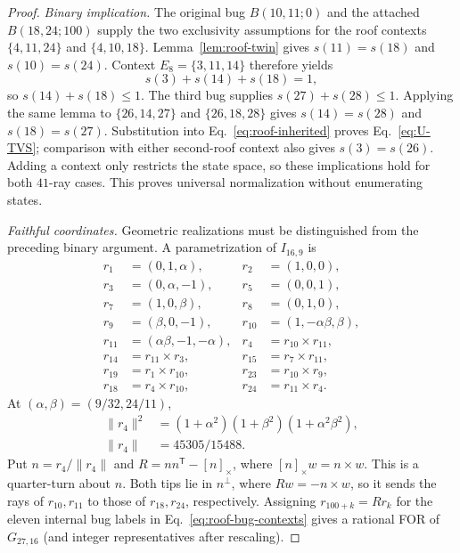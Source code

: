\documentclass[aps,pra,reprint,superscriptaddress,longbibliography,nofootinbib,floatfix,10pt]{revtex4-2}
\theoremstyle{definition}\newtheorem{definition}[theorem]{Definition}
\theoremstyle{remark}\newtheorem{remark}[theorem]{Remark}
\begin{document}
\begin{proof}
\emph{Binary implication.} The original bug $B(10,11;0)$ and the attached $B(18,24;100)$ supply the two exclusivity assumptions for the roof contexts $\{4,11,24\}$ and $\{4,10,18\}$. Lemma~\ref{lem:roof-twin} gives $s(11)=s(18)$ and $s(10)=s(24)$. Context $E_8=\{3,11,14\}$ therefore yields
\begin{equation}\label{eq:roof-inherited}
s(3)+s(14)+s(18)=1,
\end{equation}
so $s(14)+s(18)\le1$. The third bug supplies $s(27)+s(28)\le1$. Applying the same lemma to $\{26,14,27\}$ and $\{26,18,28\}$ gives $s(14)=s(28)$ and $s(18)=s(27)$. Substitution into Eq.~\eqref{eq:roof-inherited} proves Eq.~\eqref{eq:U-TVS}; comparison with either second-roof context also gives $s(3)=s(26)$. Adding a context only restricts the state space, so these implications hold for both $41$-ray cases. This proves universal normalization without enumerating states.

\emph{Faithful coordinates.} Geometric realizations must be distinguished from the preceding binary argument. A parametrization of $I_{16,9}$ is
\begin{equation}\label{eq:roof-base-rays}
\begin{aligned}
r_1&=(0,1,\alpha),&r_2&=(1,0,0),\\
r_3&=(0,\alpha,-1),&r_5&=(0,0,1),\\
r_7&=(1,0,\beta),&r_8&=(0,1,0),\\
r_9&=(\beta,0,-1),&r_{10}&=(1,-\alpha\beta,\beta),\\
r_{11}&=(\alpha\beta,-1,-\alpha),&r_4&=r_{10}\times r_{11},\\
r_{14}&=r_{11}\times r_3,&r_{15}&=r_7\times r_{11},\\
r_{19}&=r_1\times r_{10},&r_{23}&=r_{10}\times r_9,\\
r_{18}&=r_4\times r_{10},&r_{24}&=r_{11}\times r_4.
\end{aligned}
\end{equation}
At $(\alpha,\beta)=(9/32,24/11)$,
\begin{equation}\label{eq:r4-norm-factorization}
\begin{aligned}
\|r_4\|^2&=(1+\alpha^2)(1+\beta^2)(1+\alpha^2\beta^2),\\
\|r_4\|&=45305/15488.
\end{aligned}
\end{equation}
Put $n=r_4/\|r_4\|$ and $R=nn^{\mathsf T}-[n]_\times$, where $[n]_\times w=n\times w$. This is a quarter-turn about $n$. Both tips lie in $n^\perp$, where $Rw=-n\times w$, so it sends the rays of $r_{10},r_{11}$ to those of $r_{18},r_{24}$, respectively. Assigning $r_{100+k}=Rr_k$ for the eleven internal bug labels in Eq.~\eqref{eq:roof-bug-contexts} gives a rational FOR of $G_{27,16}$ (and integer representatives after rescaling).


\end{proof}
\end{document}
